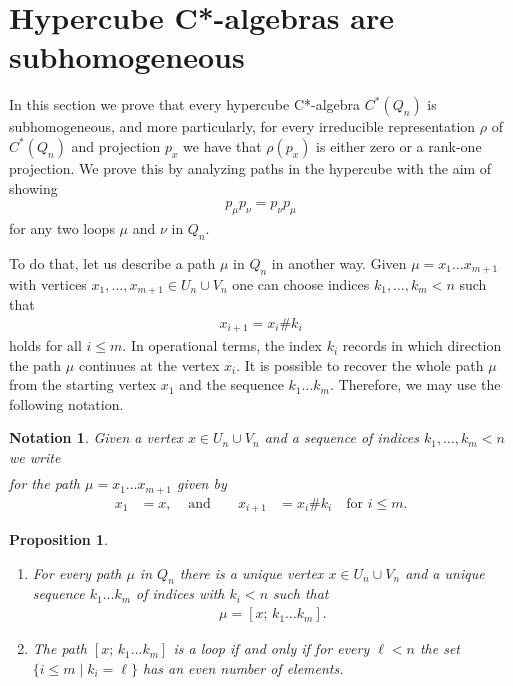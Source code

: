 \documentclass[a4paper]{amsart}
\newtheorem{proposition}[thm]{Proposition}
\newtheorem{notation}[thm]{Notation}
\begin{document}
\section{Hypercube C*-algebras are subhomogeneous}
\label{sec::subhomogeneous}

In this section we prove that every hypercube C*-algebra $C^\ast(Q_n)$ is subhomogeneous, and more particularly, for every irreducible representation $\rho$ of $C^\ast(Q_n)$ and projection $p_x$ we have that $\rho(p_x)$ is either zero or a rank-one projection. We prove this by analyzing paths in the hypercube with the aim of showing
\begin{align*}
    p_\mu p_\nu = p_\nu p_\mu
\end{align*}
for any two loops $\mu$ and $\nu$ in $Q_n$.

To do that, let us describe a path $\mu$ in $Q_n$ in another way. Given $\mu = x_1 \dots x_{m+1}$ with vertices $x_1, \dots, x_{m+1} \in U_n \cup V_n$ one can choose indices $k_1, \dots, k_m < n$ such that
\begin{align*}
    x_{i+1} = x_i \# k_i
\end{align*}
holds for all $i \leq m$. In operational terms, the index $k_i$ records in which direction the path $\mu$ continues at the vertex $x_i$. It is possible to recover the whole path $\mu$ from the starting vertex $x_1$ and the sequence $k_1 \dots k_m$. Therefore, we may use the following notation.

\begin{notation}
    Given a vertex $x \in U_n \cup V_n$ and a sequence of indices $k_1, \dots, k_m < n$ we write
    \begin{align*}
        [x; \, k_1 \dots k_m]
    \end{align*}
    for the path $\mu = x_1 \dots x_{m+1}$ given by
    \begin{align*}
        x_1 &= x, &\text{ and } &&
        x_{i+1} &= x_i \# k_i \quad \text{for } i \leq m.
    \end{align*}
\end{notation}

\begin{proposition}
    \label{sub::prop:operation_on_paths}
    \begin{enumerate}
        \item For every path $\mu$ in $Q_n$ there is a unique vertex $x \in U_n \cup V_n$ and a unique sequence $k_1 \dots k_m$ of indices with $k_i < n$ such that
        \begin{align*}
            \mu = [x; \, k_1 \dots k_m].
        \end{align*}
        \item The path $[x; \, k_1 \dots k_m]$ is a loop if and only if for every $\ell < n$ the set $\{i \leq m \mid k_i = \ell\}$ has an even number of elements.
    \end{enumerate}
\end{proposition}
\end{document}
